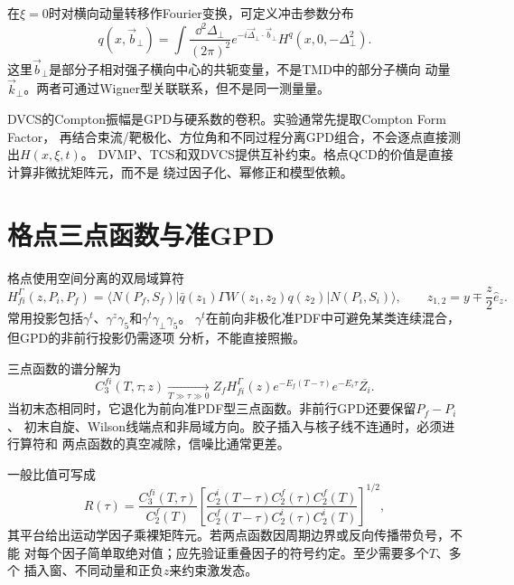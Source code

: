 在$\xi=0$时对横向动量转移作Fourier变换，可定义冲击参数分布
\begin{equation}
  q(x,\vec b_\perp)
  =\int\frac{\dd^2\Delta_\perp}{(2\pi)^2}
  e^{-i\vec\Delta_\perp\cdot\vec b_\perp}
  H^q(x,0,-\Delta_\perp^2).
  \label{eq:b04-impact-parameter}
\end{equation}
这里$\vec b_\perp$是部分子相对强子横向中心的共轭变量，不是TMD中的部分子横向
动量$\vec k_\perp$。两者可通过Wigner型关联联系，但不是同一测量量。

DVCS的Compton振幅是GPD与硬系数的卷积。实验通常先提取Compton Form Factor，
再结合束流/靶极化、方位角和不同过程分离GPD组合，不会逐点直接测出$H(x,\xi,t)$。
DVMP、TCS和双DVCS提供互补约束。格点QCD的价值是直接计算非微扰矩阵元，而不是
绕过因子化、幂修正和模型依赖。

\section{格点三点函数与准GPD}

格点使用空间分离的双局域算符
\begin{equation}
  H^\Gamma_{fi}(z,P_i,P_f)
  =\langle N(P_f,S_f)|\bar q(z_1)\Gamma W(z_1,z_2)q(z_2)
  |N(P_i,S_i)\rangle,
  \qquad
  z_{1,2}=y\mp\frac{z}{2}\hat e_z .
  \label{eq:b04-euclidean-gpd}
\end{equation}
常用投影包括$\gamma^t$、$\gamma^z\gamma_5$和$\gamma^t\gamma_\perp\gamma_5$。
$\gamma^t$在前向非极化准PDF中可避免某类连续混合，但GPD的非前行投影仍需逐项
分析，不能直接照搬。

三点函数的谱分解为
\begin{equation}
  C_3^{fi}(T,\tau;z)
  \xrightarrow[T\gg\tau\gg0]{}
  Z_fH^\Gamma_{fi}(z)e^{-E_f(T-\tau)}e^{-E_i\tau}\overline{Z_i}.
  \label{eq:b04-gpd-3pt}
\end{equation}
当初末态相同时，它退化为前向准PDF型三点函数。非前行GPD还要保留$P_f-P_i$、
初末自旋、Wilson线端点和非局域方向。胶子插入与核子线不连通时，必须进行算符和
两点函数的真空减除，信噪比通常更差。

一般比值可写成
\begin{equation}
  R(\tau)=\frac{C_3^{fi}(T,\tau)}{C_2^f(T)}
  \left[
  \frac{C_2^i(T-\tau)C_2^f(\tau)C_2^f(T)}
       {C_2^f(T-\tau)C_2^i(\tau)C_2^i(T)}
  \right]^{1/2},
  \label{eq:b04-gpd-ratio}
\end{equation}
其平台给出运动学因子乘裸矩阵元。若两点函数因周期边界或反向传播带负号，不能
对每个因子简单取绝对值；应先验证重叠因子的符号约定。至少需要多个$T$、多个
插入窗、不同动量和正负$z$来约束激发态。

